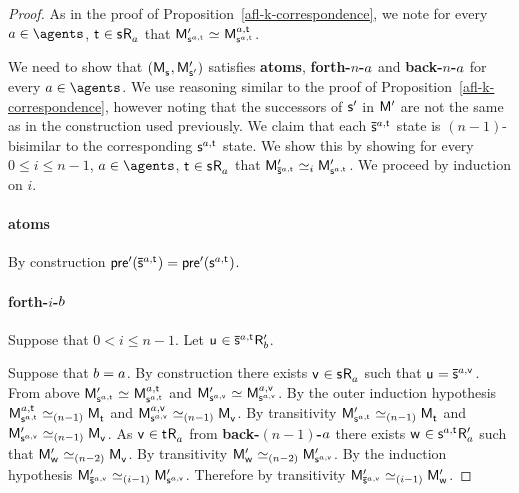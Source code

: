\begin{proof}
As in the proof of Proposition~\ref{afl-k-correspondence}, we note for every $\agentA \in \agents$, $\aStateT \in \aStateS \aAccessibility{\agentA}$ that $\aPModel[\prime]{\aStateS[\agentA,\aStateT]} \bisimilar \aPModel[\agentA,\aStateT]{\aStateS[\agentA,\aStateT]}$.

We need to show that $(\aPModel{\aStateS}, \aPModel[\prime]{\aStateS[\prime]})$ satisfies {\bf atoms}, {\bf forth-$n$-$\agentA$} and {\bf back-$n$-$\agentA$} for every $\agentA \in \agents$.
We use reasoning similar to the proof of Proposition~\ref{afl-k-correspondence}, however noting that the successors of $\aStateS[\prime]$ in $\aModel[\prime]$ are not the same as in the construction used previously.
We claim that each $\aPStateS[\agentA,\aStateT]$ state is $(n-1)$-bisimilar to the corresponding $\aStateS[\agentA,\aStateT]$ state.
We show this by showing for every $0 \leq i \leq n - 1$, $\agentA \in \agents$, $\aStateT \in \aStateS \aAccessibility{\agentA}$ that $\aPModel[\prime]{\aPStateS[\agentA,\aStateT]} \bisimilar[i] \aPModel[\prime]{\aStateS[\agentA,\aStateT]}$.
We proceed by induction on $i$.

\paragraph{atoms} By construction $\aPrecondition[\prime](\aPStateS[\agentA, \aStateT]) = \aPrecondition[\prime](\aStateS[\agentA,\aStateT])$.

\paragraph{forth-$i$-$\agentB$} Suppose that $0 < i \leq n - 1$. Let $\aStateU \in \aPStateS[\agentA,\aStateT] \aAccessibility[\prime]{\agentB}$. 

Suppose that $\agentB = \agentA$. 
By construction there exists $\aStateV \in \aStateS \aAccessibility{\agentA}$ such that $\aStateU = \aPStateS[\agentA,\aStateV]$.
From above $\aPModel[\prime]{\aStateS[\agentA,\aStateT]} \bisimilar \aPModel[\agentA,\aStateT]{\aStateS[\agentA,\aStateT]}$ and $\aPModel[\prime]{\aStateS[\agentA,\aStateV]} \bisimilar \aPModel[\agentA,\aStateV]{\aStateS[\agentA,\aStateV]}$.
By the outer induction hypothesis $\aPModel[\agentA,\aStateT]{\aStateS[\agentA,\aStateT]} \bisimilar[(n - 1)] \aPModel{\aStateT}$ and $\aPModel[\agentA,\aStateV]{\aStateS[\agentA,\aStateV]} \bisimilar[(n - 1)] \aPModel{\aStateV}$.
By transitivity $\aPModel[\prime]{\aStateS[\agentA,\aStateT]} \bisimilar[(n - 1)] \aPModel{\aStateT}$ and $\aPModel[\prime]{\aStateS[\agentA,\aStateV]} \bisimilar[(n - 1)] \aPModel{\aStateV}$.
As $\aStateV \in \aStateT \aAccessibility{\agentA}$ from {\bf back-$(n - 1)$-$\agentA$} there exists $\aStateW \in \aStateS[\agentA,\aStateT] \aAccessibility[\prime]{\agentA}$ such that $\aPModel[\prime]{\aStateW} \bisimilar[(n - 2)] \aPModel{\aStateV}$.
By transitivity $\aPModel[\prime]{\aStateW} \bisimilar[(n - 2)] \aPModel[\prime]{\aStateS[\agentA,\aStateV]}$.
By the induction hypothesis $\aPModel[\prime]{\aPStateS[\agentA,\aStateV]} \bisimilar[(i - 1)] \aPModel[\prime]{\aStateS[\agentA,\aStateV]}$.
Therefore by transitivity $\aPModel[\prime]{\aPStateS[\agentA,\aStateV]} \bisimilar[(i - 1)] \aPModel[\prime]{\aStateW}$.


\end{proof}
